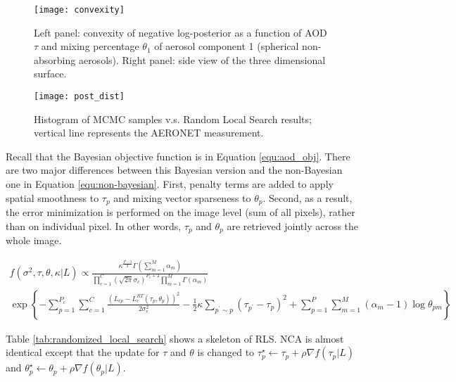 \begin{figure}[h!]
    \centering
    \texttt{[image: convexity]}
    \caption{Left panel: convexity of negative log-posterior as a function of AOD $\tau$ and mixing percentage $\theta_1$ of aerosol component 1 (spherical non-absorbing aerosols). Right panel: side view of the three dimensional surface.}
    \label{fig:convexity}
\end{figure}

\begin{figure}[h!]
    \centering
    \texttt{[image: post\_dist]}
    \caption{Histogram of MCMC samples v.s. Random Local Search results; vertical line represents the AERONET measurement.}
    \label{fig:post_dist}
\end{figure}

Recall that the Bayesian objective function is in Equation \eqref{equ:aod_obj}. There are two major differences between this Bayesian version and the non-Bayesian one in Equation \eqref{equ:non-bayesian}. First, penalty terms are added to apply spatial smoothness to $\tau_p$ and mixing vector sparseness to $\theta_p$. Second, as a result, the error minimization is performed on the image level (sum of all pixels), rather than on individual pixel. In other words, $\tau_p$ and $\theta_p$ are retrieved jointly across the whole image.

\clearpage
\begin{multline}
f(\sigma^2,\tau,\theta,\kappa|L)  \propto \frac{\kappa^{\frac{P-3}{2}}\Gamma(\sum\limits_{m=1}^M\alpha_m)}{\prod\limits_{c=1}^C(\sqrt{2\pi}\sigma_c)^{P_c+2}\prod\limits_{m=1}^M\Gamma(\alpha_m)}\\
\exp\left 
\{-\sum\limits_{p=1}^{P_c}\sum\limits_{c=1}^{C}\frac{\left(L_{cp}-  L_{c}^{RT}\left(\tau_p,\theta_p\right)\right)^2}{2\sigma_c^2}
-\frac{1}{2}\kappa\sum\limits_{p^{\prime}\sim p}(\tau_{p^\prime}-\tau_p)^2 + \sum\limits_{p=1}^{P}\sum\limits_{m=1}^{M}(\alpha_m-1)\log\theta_{pm} \right\}
 \label{equ:aod_obj}
\end{multline}

Table \ref{tab:randomized_local_search} shows a skeleton of RLS. NCA is almost identical except that the update for $\tau$ and $\theta$ is changed to $\tau_p^\star \leftarrow \tau_p + \rho\nabla f(\tau_p|L)$ and $\theta_p^\star \leftarrow \theta_p + \rho\nabla f(\theta_p|L)$.

